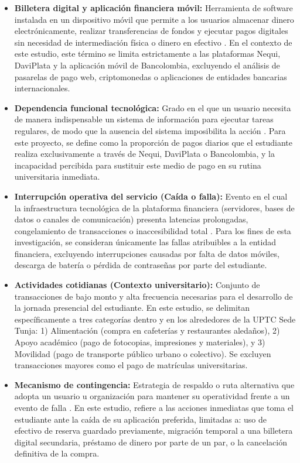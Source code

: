 \begin{itemize}
    \item \textbf{Billetera digital y aplicación financiera móvil:} Herramienta de software instalada en un dispositivo móvil que permite a los usuarios almacenar dinero electrónicamente, realizar transferencias de fondos y ejecutar pagos digitales sin necesidad de intermediación física o dinero en efectivo \cite{bpmconsulting}. En el contexto de este estudio, este término se limita estrictamente a las plataformas Nequi, DaviPlata y la aplicación móvil de Bancolombia, excluyendo el análisis de pasarelas de pago web, criptomonedas o aplicaciones de entidades bancarias internacionales.
    
    \item \textbf{Dependencia funcional tecnológica:} Grado en el que un usuario necesita de manera indispensable un sistema de información para ejecutar tareas regulares, de modo que la ausencia del sistema imposibilita la acción \cite{saviasalud}. Para este proyecto, se define como la proporción de pagos diarios que el estudiante realiza exclusivamente a través de Nequi, DaviPlata o Bancolombia, y la incapacidad percibida para sustituir este medio de pago en su rutina universitaria inmediata.
    
    \item \textbf{Interrupción operativa del servicio (Caída o falla):} Evento en el cual la infraestructura tecnológica de la plataforma financiera (servidores, bases de datos o canales de comunicación) presenta latencias prolongadas, congelamiento de transacciones o inaccesibilidad total \cite{cyberhoot}. Para los fines de esta investigación, se consideran únicamente las fallas atribuibles a la entidad financiera, excluyendo interrupciones causadas por falta de datos móviles, descarga de batería o pérdida de contraseñas por parte del estudiante.
    
    \item \textbf{Actividades cotidianas (Contexto universitario):} Conjunto de transacciones de bajo monto y alta frecuencia necesarias para el desarrollo de la jornada presencial del estudiante. En este estudio, se delimitan específicamente a tres categorías dentro y en los alrededores de la UPTC Sede Tunja: 1) Alimentación (compra en cafeterías y restaurantes aledaños), 2) Apoyo académico (pago de fotocopias, impresiones y materiales), y 3) Movilidad (pago de transporte público urbano o colectivo). Se excluyen transacciones mayores como el pago de matrículas universitarias.
    
    \item \textbf{Mecanismo de contingencia:} Estrategia de respaldo o ruta alternativa que adopta un usuario u organización para mantener su operatividad frente a un evento de falla \cite{ibm_contingencia}. En este estudio, refiere a las acciones inmediatas que toma el estudiante ante la caída de su aplicación preferida, limitadas a: uso de efectivo de reserva guardado previamente, migración temporal a una billetera digital secundaria, préstamo de dinero por parte de un par, o la cancelación definitiva de la compra.
\end{itemize}